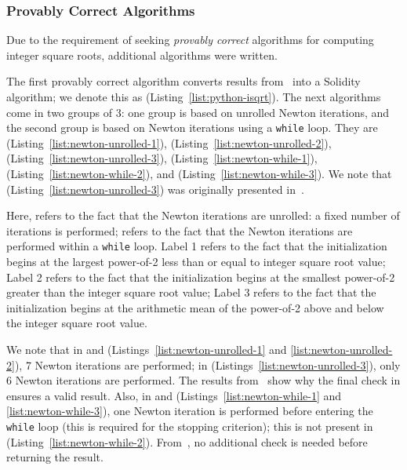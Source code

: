 




\subsubsection{Provably Correct Algorithms}

Due to the requirement of seeking \emph{provably correct}
algorithms for computing integer square roots,
additional algorithms were written.

The first provably correct algorithm converts results from~\cite{PythonIsqrt}
into a Solidity algorithm;
we denote this as
\python{} (Listing~\ref{list:python-isqrt}).
The next algorithms come in two groups of 3:
one group is based on unrolled Newton iterations,
and the second group is based on Newton iterations using a \texttt{while} loop.
They are
\UnrolledOne{} (Listing~\ref{list:newton-unrolled-1}),
\UnrolledTwo{} (Listing~\ref{list:newton-unrolled-2}),
\UnrolledThree{} (Listing~\ref{list:newton-unrolled-3}),
\WhileOne{} (Listing~\ref{list:newton-while-1}),
\WhileTwo{} (Listing~\ref{list:newton-while-2}), and
\WhileThree{} (Listing~\ref{list:newton-while-3}).
We note that \UnrolledThree{} (Listing~\ref{list:newton-unrolled-3})
was originally presented in~\cite{EfficientIsqrt}.

Here, \Unrolled{} refers to the fact that the Newton iterations
are unrolled: a fixed number of iterations is performed;
\While{} refers to the fact that the Newton iterations are performed
within a \texttt{while} loop.
Label 1 refers to the fact that the initialization begins
at the largest power-of-2 less than or equal to integer square root value;
Label 2 refers to the fact that the initialization begins
at the smallest power-of-2 greater than the integer square root value;
Label 3 refers to the fact that the initialization begins
at the arithmetic mean of the power-of-2 above and below
the integer square root value.

We note that in \UnrolledOne{} and \UnrolledTwo{}
(Listings~\ref{list:newton-unrolled-1} and \ref{list:newton-unrolled-2}),
7 Newton iterations are performed;
in \UnrolledThree{} (Listings~\ref{list:newton-unrolled-3}),
only 6 Newton iterations are performed.
The results from~\cite{EfficientIsqrt}
show why the final check in \Unrolled{} ensures a valid result.
Also, in \WhileOne{} and \WhileThree{}
(Listings~\ref{list:newton-while-1} and \ref{list:newton-while-3}),
one Newton iteration is performed
before entering the \texttt{while} loop
(this is required for the stopping criterion);
this is not present in \WhileTwo{} (Listing~\ref{list:newton-while-2}).
From~\cite[Algorithm 1.7.1]{cohen1993},
no additional check is needed before returning the result.

